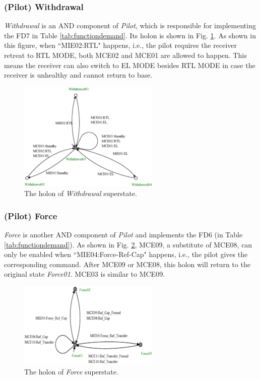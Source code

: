 \subsubsection{(Pilot) Withdrawal}
\textit{Withdrawal} is an AND component of \textit{Pilot}, which is responsible for implementing the FD7 in Table \ref{tab:functiondemand}. Its holon is shown in Fig. \ref{fig:holonwith}. As shown in this figure, when ``MIE02:RTL" happens, i.e., the pilot requires the receiver retreat to RTL MODE, both MCE02 and MCE01 are allowed to happen. This means the receiver can also switch to EL MODE besides RTL MODE in case the receiver is unhealthy and cannot return to base.
\begin{figure}[h]
	\begin{center}
		\includegraphics[width=0.6\textwidth]{Figures/Figs_Ch14/Fig18a_HWithdrawal}
		\par\end{center}
	\caption{The holon of \textit{Withdrawal} superstate.}
	\label{fig:holonwith} 
\end{figure}	


\subsubsection{(Pilot) Force}
\textit{Force} is another AND component of \textit{Pilot} and implements the FD6 (in Table \ref{tab:functiondemand}). As shown in Fig. \ref{fig:holonforce}, MCE09, a substitute of MCE08, can only be enabled when ``MIE04:Force-Ref-Cap" happens, i.e., the pilot gives the corresponding command. After MCE09 or MCE08, this holon will return to the original state \textit{Force01}. MCE03 is similar to MCE09.
\begin{figure}[h]
	\begin{center}
		\includegraphics[width=0.6\textwidth]{Figures/Figs_Ch14/Fig18b_HForce}
		\par\end{center}
	\caption{The holon of \textit{Force} superstate.}
	\label{fig:holonforce} 
\end{figure}	


